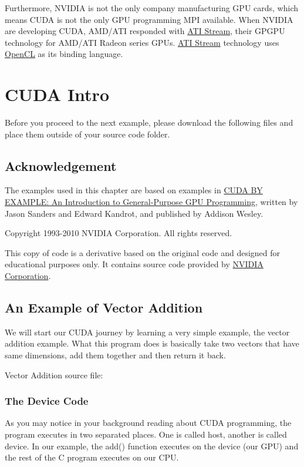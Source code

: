 \documentclass[letterpaper,10pt,openany,oneside]{sphinxmanual}
\begin{document}
Furthermore, NVIDIA is not the only company manufacturing GPU cards, which means CUDA is not the only GPU programming MPI available. When NVIDIA are developing CUDA, AMD/ATI responded with \href{http://www.amd.com/stream/}{ATI Stream}, their GPGPU technology for AMD/ATI Radeon series GPUs. \href{http://www.amd.com/stream/}{ATI Stream} technology uses \href{http://en.wikipedia.org/wiki/OpenCL}{OpenCL} as its binding language.


\chapter{CUDA Intro}
\label{CUDAIntro/CUDAIntro:opencl}\label{CUDAIntro/CUDAIntro::doc}\label{CUDAIntro/CUDAIntro:cuda-intro}
Before you proceed to the next example, please download the following files and place them outside of your source code folder.


\section{Acknowledgement}
\label{CUDAIntro/CUDAIntro:acknowledgement}
The examples used in this chapter are based on examples in \href{http://developer.nvidia.com/content/cuda-example-introduction-general-purpose-gpu-programming-0}{CUDA BY EXAMPLE: An Introduction to General-Purpose GPU Programming}, written by Jason Sanders and Edward Kandrot, and published by Addison Wesley.

Copyright 1993-2010 NVIDIA Corporation.  All rights reserved.

This copy of code is a derivative based on the original code and designed for educational purposes only. It contains source code provided by \href{http://www.nvidia.com}{NVIDIA Corporation}.


\section{An Example of Vector Addition}
\label{CUDAIntro/CUDAIntro:nvidia-corporation}\label{CUDAIntro/CUDAIntro:an-example-of-vector-addition}
We will start our CUDA journey by learning a very simple example, the vector addition example. What this program does is basically take two vectors that have same dimensions, add them together and then return it back.

Vector Addition source file:


\subsection{The Device Code}
\label{CUDAIntro/CUDAIntro:the-device-code}
As you may notice in your background reading about CUDA programming, the program executes in two separated places. One is called host, another is called device. In our example, the add() function executes on the device (our GPU) and the rest of the C program executes on our CPU.
\end{document}
